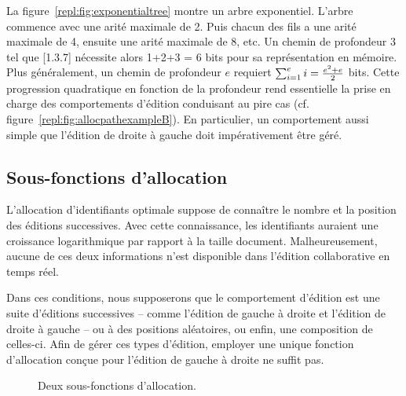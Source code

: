 La figure~\ref{repl:fig:exponentialtree} montre un arbre exponentiel. L'arbre
commence avec une arité maximale de 2. Puis chacun des fils a une arité maximale
de 4, ensuite une arité maximale de 8, etc. Un chemin de profondeur 3 tel que
[1.3.7] nécessite alors 1+2+3 = 6 bits pour sa représentation en mémoire.  Plus
généralement, un chemin de profondeur $e$ requiert
$\textstyle\sum\nolimits_{i=1}^{e}i = {e^2 + e \over{2}}$ bits. Cette
progression quadratique en fonction de la profondeur rend essentielle la prise
en charge des comportements d'édition conduisant au pire cas
(cf. figure~\ref{repl:fig:allocpathexampleB}). En particulier, un comportement
aussi simple que l'édition de droite à gauche doit impérativement être géré.

\subsection{Sous-fonctions d'allocation}
\label{repl:subsec:suballocation}

L'allocation d'identifiants optimale suppose de connaître le nombre et la
position des éditions successives. Avec cette connaissance, les identifiants
auraient une croissance logarithmique par rapport à la taille
document. Malheureusement, aucune de ces deux informations n'est disponible dans
l'édition collaborative en temps réel.

Dans ces conditions, nous supposerons que le comportement d'édition est une
suite d'éditions successives -- comme l'édition de gauche à droite et l'édition
de droite à gauche -- ou à des positions aléatoires, ou enfin, une composition
de celles-ci. Afin de gérer ces types d'édition, employer une unique fonction
d'allocation conçue pour l'édition de gauche à droite ne suffit pas.

\begin{figure}
  \begin{center}
    \hspace{20pt}
    \caption[Deux sous-fonctions d'allocation]
    {\label{repl:fig:suballocation}Deux sous-fonctions d'allocation.}
  \end{center}
\end{figure}

